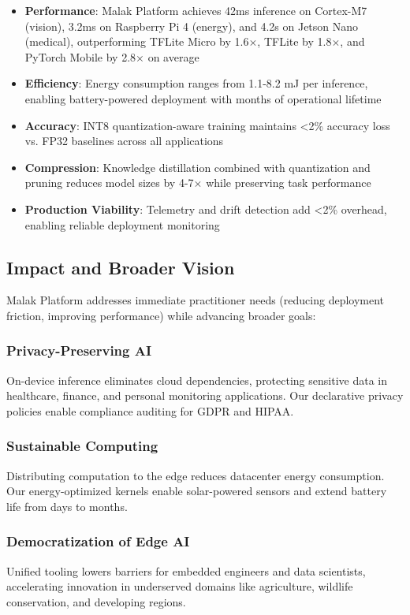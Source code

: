 \begin{itemize}
\item \textbf{Performance}: Malak Platform achieves 42ms inference on Cortex-M7 (vision), 3.2ms on Raspberry Pi 4 (energy), and 4.2s on Jetson Nano (medical), outperforming TFLite Micro by 1.6$\times$, TFLite by 1.8$\times$, and PyTorch Mobile by 2.8$\times$ on average
\item \textbf{Efficiency}: Energy consumption ranges from 1.1-8.2 mJ per inference, enabling battery-powered deployment with months of operational lifetime
\item \textbf{Accuracy}: INT8 quantization-aware training maintains <2\% accuracy loss vs. FP32 baselines across all applications
\item \textbf{Compression}: Knowledge distillation combined with quantization and pruning reduces model sizes by 4-7$\times$ while preserving task performance
\item \textbf{Production Viability}: Telemetry and drift detection add <2\% overhead, enabling reliable deployment monitoring
\end{itemize}

\subsection{Impact and Broader Vision}

Malak Platform addresses immediate practitioner needs (reducing deployment friction, improving performance) while advancing broader goals:

\subsubsection{Privacy-Preserving AI}
On-device inference eliminates cloud dependencies, protecting sensitive data in healthcare, finance, and personal monitoring applications. Our declarative privacy policies enable compliance auditing for GDPR and HIPAA.

\subsubsection{Sustainable Computing}
Distributing computation to the edge reduces datacenter energy consumption. Our energy-optimized kernels enable solar-powered sensors and extend battery life from days to months.

\subsubsection{Democratization of Edge AI}
Unified tooling lowers barriers for embedded engineers and data scientists, accelerating innovation in underserved domains like agriculture, wildlife conservation, and developing regions.


